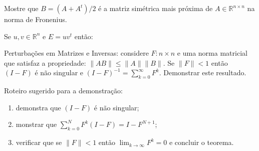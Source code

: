 \documentclass[a4paper,12pt, leqno, answers]{exam}
\begin{document}
\begin{questions}
\begin{parts}
\begin{solution}
        \end{solution}
    \end{parts}

    \question Mostre que $B = \left( A + A^t \right) / 2$ \'{e} a matriz sim\'{e}trica mais pr\'{o}xima de $A \in \mathbb{R}^{n \times n}$ na norma de Fronenius.
    \begin{solution}
        
    \end{solution}

    \question Se $u, v \in \mathbb{R}^n$ e $E = u v^t$ ent\~{a}o:

    \question Perturba\c{c}\~{o}es em Matrizes e Inversas: considere $F : n \times n$ e uma norma matricial que satisfaz a propriedade: $\| A B \| \leq \| A \| \| B \|$. Se $\| F \| < 1$ ent\~{a}o $\left( I - F \right)$ \'{e} n\~{a}o singular e $\left( I - F \right)^{-1} = \sum_{k = 0}^\infty F^k$. Demonstrar este resultado.

    Roteiro sugerido para a demonstra\c{c}\~{a}o:
    \begin{enumerate}
        \item demonstra que $\left( I - F \right)$ \'{e} n\~{a}o singular;
        \item monstrar que $\sum_{k = 0}^N F^k \left( I - F \right) = I - F^{N + 1}$;
        \item verificar que se $\| F \| < 1$ ent\~{a}o $\lim_{k \rightarrow \infty} F^k = 0$ e concluir o teorema.
    \end{enumerate}
    \begin{solution}
        

\end{solution}
\end{questions}
\end{document}
